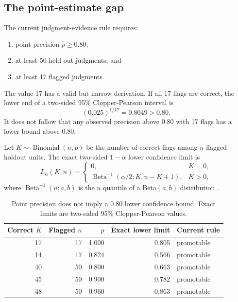\documentclass[11pt]{article}
\newcommand{\BetaInv}{\operatorname{Beta}^{-1}}
\begin{document}
\subsection{The point-estimate gap}

The current judgment-evidence rule requires:

\begin{enumerate}
  \item point precision $\widehat p\ge 0.80$;
  \item at least 50 held-out judgments; and
  \item at least 17 flagged judgments.
\end{enumerate}

The value 17 has a valid but narrow derivation. If all 17 flags are correct, the lower end of
a two-sided 95\% Clopper-Pearson interval is
\[
 (0.025)^{1/17}=0.8049>0.80.
\]
It does not follow that any observed precision above 0.80 with 17 flags has a lower bound
above 0.80.

Let $K\sim\operatorname{Binomial}(n,p)$ be the number of correct flags among $n$ flagged
holdout units. The exact two-sided $1-\alpha$ lower confidence limit is
\begin{equation}
 L_{\alpha}(K,n)=
 \begin{cases}
 0, & K=0,\\
 \BetaInv(\alpha/2;K,n-K+1), & K>0,
 \end{cases}
 \label{eq:cp}
\end{equation}
where $\BetaInv(u;a,b)$ is the $u$ quantile of a Beta$(a,b)$ distribution
\cite{clopper1934}.

\begin{table}[ht]
\centering
\caption{Point precision does not imply a 0.80 lower confidence bound. Exact limits are
two-sided 95\% Clopper-Pearson values.}
\label{tab:cp}
\begin{tabular}{rrrrl}
\toprule
Correct $K$ & Flagged $n$ & $\widehat p$ & Exact lower limit & Current rule \\
\midrule
17 & 17 & 1.000 & 0.805 & promotable \\
14 & 17 & 0.824 & 0.566 & promotable \\
40 & 50 & 0.800 & 0.663 & promotable \\
45 & 50 & 0.900 & 0.782 & promotable \\
48 & 50 & 0.960 & 0.863 & promotable \\
\bottomrule
\end{tabular}
\end{table}
\end{document}
